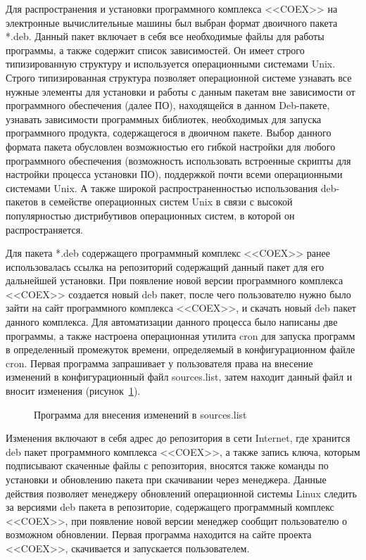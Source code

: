 ﻿Для распространения и установки программного комплекса <<COEX>> на электронные вычислительные машины был выбран формат двоичного пакета *.deb. Данный пакет включает в себя все необходимые файлы для работы программы, а также содержит список зависимостей. Он имеет строго типизированную структуру и используется операционными системами Unix. Строго типизированная структура позволяет операционной системе узнавать все нужные элементы для установки и работы с данным пакетам вне зависимости от программного обеспечения (далее ПО), находящейся в данном Deb-пакете, узнавать зависимости программных библиотек, необходимых для запуска программного продукта, содержащегося в двоичном пакете.  Выбор данного формата пакета обусловлен возможностью его гибкой настройки для любого программного обеспечения (возможность использовать встроенные скрипты для настройки процесса установки ПО), поддержкой почти всеми операционными системами Unix. А также широкой распространенностью использования deb-пакетов в семействе операционных систем Unix в связи с высокой популярностью дистрибутивов операционных систем, в которой он распространяется.~\cite{tecmint}  

Для пакета *.deb содержащего программный комплекс <<COEX>> ранее использовалась ссылка на репозиторий содержащий данный пакет для его дальнейшей установки. При появление новой версии программного комплекса <<COEX>> создается новый deb пакет, после чего пользователю нужно было зайти на сайт программного комплекса <<COEX>>, и скачать новый deb пакет данного комплекса. Для автоматизации данного процесса было написаны две программы, а также настроена операционная утилита cron для запуска программ в определенный промежуток времени, определяемый в конфигурационном файле cron. Первая программа запрашивает у пользователя права на внесение изменений в конфигурационный файл sources.list, затем находит данный файл и вносит изменения (рисунок~\ref{ser_1:ser_1}). 

\begin{figure}[!ht]
\caption{ Программа для внесения изменений в sources.list }
\label{ser_1:ser_1}
\end{figure}

Изменения включают в себя адрес до репозитория   в сети Internet, где хранится deb пакет программного комплекса <<COEX>>, а также запись ключа, которым подписывают скаченные файлы с репозитория, вносятся также команды по установки и обновлению пакета при скачивании через менеджера. Данные действия позволяет менеджеру обновлений операционной системы Linux следить за версиями deb пакета в репозиторие, содержащего программный комплекс <<COEX>>, при появление новой версии менеджер сообщит пользователю о возможном обновлении. Первая программа находится на сайте проекта <<COEX>>, скачивается и запускается пользователем. 

